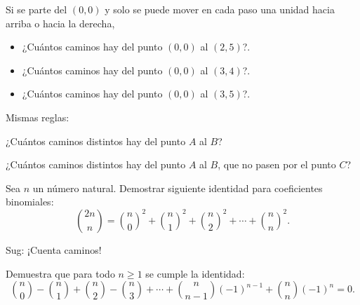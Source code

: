 
\begin{ejercicio} Si se parte del $(0,0)$ y solo se puede mover en cada paso una unidad hacia arriba o hacia la derecha,
\begin{itemize}
    \item ¿Cuántos caminos hay del punto $(0,0)$ al $(2,5)$?.
    \item ¿Cuántos caminos hay del punto $(0,0)$ al $(3,4)$?.
    \item ¿Cuántos caminos hay del punto $(0,0)$ al $(3,5)$?.
\end{itemize}
\end{ejercicio}

\begin{ejercicio}
Mismas reglas: 

¿Cuántos caminos distintos hay del punto $A$ al $B$?

¿Cuántos caminos distintos hay del punto $A$ al $B$, que no pasen por el punto $C$?

\begin{center}
\end{center}
\end{ejercicio}

\begin{ejercicio}
Sea $n$ un número natural. Demostrar siguiente identidad para coeficientes binomiales:
$${2n\choose n}={n \choose 0}^2+{n \choose 1}^2+{n \choose 2}^2+\cdots +{n \choose n}^2.$$
\end{ejercicio}
Sug: ¡Cuenta caminos!
\vspace{4cm}

\begin{ejercicio} Demuestra que para todo $n\geq 1$ se cumple la identidad:
$${n \choose 0}-{n \choose 1}+{n \choose 2}-{n \choose 3}+\cdots +{n \choose n-1}(-1)^{n-1} +{n \choose n}(-1)^n=0.$$
\end{ejercicio}
\vspace{2cm}

